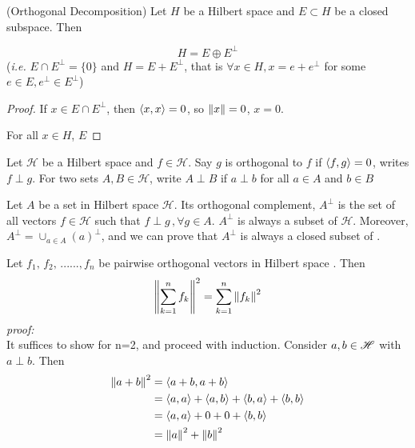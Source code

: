\documentclass{article}
\begin{document}
\begin{corollary}
(Orthogonal Decomposition) Let $H$ be a Hilbert space and $E \subset H$ be a closed subspace. Then  

$$
H = E \oplus E^{\perp}
$$  
(\textit{i.e.} $E \cap E^{\perp} = \{0\}$ and $H = E + E^{\perp}$, that is $\forall x \in H, x=e+ e^{\perp}$ for some $e \in E, e^{\perp} \in E^{\perp}$)
\end{corollary}

\begin{proof}
If $x \in E\cap E^{\perp}$, then $\left<{x},{x}\right>=0$, so $\left\|{x}\right\|=0$, $x=0$.  

For all $x\in H$, $E$
\end{proof}

\begin{definition}[Orthogonality]\rm\nextline
	Let $\mathscr{H}$ be a Hilbert space and $f\in\mathscr{H}$. Say $g$ is orthogonal to $f$ if $\left<{f},{g}\right>=0$, writes $f\perp g$. For two sets $A,B\in \mathscr{H}$, write $A\perp B$ if $a\perp b$ for all $a\in A$ and $b\in B$


\end{definition}

\begin{definition}\rm\label{ortho comp}\nextline
	Let $A$ be a set in Hilbert space $\mathscr{H}$. Its orthogonal complement, $A^{\perp}$ is the set of all vectors $f \in \mathscr{H}$ such
	that $f\perp g\,,\forall g \in A$. $A^\perp$ is always a subset of $\mathscr{H}$. Moreover, $A^\perp=\cup_{a\in A}(a)^\perp$, and we can prove that $A^\perp$ is always a closed subset of \hbs.
\end{definition}

\begin{proposition}\rm\nextline
	Let $f_1,\,f_2,\,......,f_n$ be pairwise orthogonal vectors in Hilbert space \hbs. Then
	$$
		\left\|{\sum_{k=1}^n f_k}\right\|^2={\sum_{k=1}^n \left\|{f_k}\right\|^2}
	$$
	\textit{proof:}\\
	It suffices to show for n=2, and proceed with induction. Consider $a,b\in \mathscr{H}$ with $a\perp b$.
	Then
	\begin{equation}
		\begin{split}
			\left\|{a+b}\right\|^2&=\left<{a+b},{a+b}\right>\\
			&=\left<{a},{a}\right>+\left<{a},{b}\right>+\left<{b},{a}\right>+\left<{b},{b}\right>\\
			&=\left<{a},{a}\right>+0+0+\left<{b},{b}\right>\\
			&=\left\|{a}\right\|^2+\left\|{b}\right\|^2
		\end{split}
	\end{equation}


\end{proposition}
\end{document}
